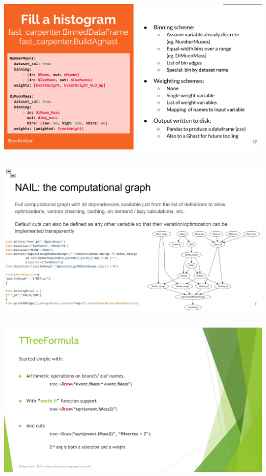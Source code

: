 \documentclass[aspectratio=169]{beamer}
\begin{document}
\begin{frame}{}
\vspace{-0.05 cm}
\begin{columns}
\includegraphics[width=\linewidth]{slides-09.png}
\end{columns}
\end{frame}

\begin{frame}{}
\vspace{-0.05 cm}
\begin{columns}
\includegraphics[width=\linewidth]{slides-10.png}
\end{columns}
\end{frame}

\begin{frame}{}
\vspace{-0.05 cm}
\begin{columns}
\includegraphics[width=\linewidth]{slides-11.png}
\end{columns}
\end{frame}
\end{document}
